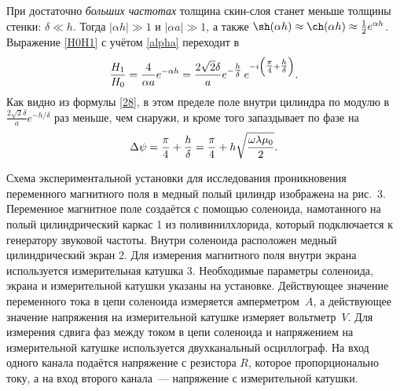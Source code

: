 При достаточно \emph{больших частотах} толщина скин-слоя станет меньше толщины стенки:
$\delta \ll h$. Тогда $|\alpha h| \gg 1$ и $|\alpha a| \gg 1$, а
также $\sh(\alpha h)\approx\ch(\alpha h)\approx\frac12e^{\alpha h}$.
Выражение \eqref{H0H1} с учётом \eqref{alpha} переходит в
\begin{equation} \eqmark{28}
\frac{H_1}{H_0}= \frac{4}{\alpha a} e^{-\alpha h}
= \frac{2\sqrt{2}\delta}{a}e^{-\tfrac{h}{\delta}}\,e^{-i\left(\tfrac{\pi}{4}+\tfrac{h}{\delta}\right)}.
\end{equation}
Как видно из формулы \eqref{28}, в этом пределе поле внутри цилиндра по модулю в
$\frac{2\sqrt{2}\delta}{a}e^{-h/\delta}$ раз меньше, чем снаружи, и
кроме того запаздывает по фазе на
\begin{equation} \eqmark{29}
\Delta\psi=\frac{\pi}{4}+\frac{h}{\delta}=
\frac{\pi}{4}+h\sqrt{\frac{\omega\lambda\mu_0}{2}}.
\end{equation}





\experiment
Схема экспериментальной установки для исследования проникновения переменного магнитного поля в медный полый цилиндр
изображена на рис.~3. Переменное магнитное поле создаётся с помощью соленоида, намотанного на полый цилиндрический каркас 1
из поливинилхлорида, который подключается к генератору звуковой частоты. Внутри соленоида расположен медный цилиндрический
экран 2. Для измерения магнитного поля внутри экрана используется измерительная катушка 3. Необходимые параметры
соленоида, экрана и измерительной катушки указаны на установке. Действующее значение переменного тока в цепи соленоида
измеряется амперметром~$A$, а действующее значение напряжения
на измерительной катушке измеряет вольтметр~$V$. Для измерения сдвига фаз между током в цепи соленоида и напряжением на измерительной катушке
используется двухканальный осциллограф. На вход одного канала подаётся напряжение с резистора $R$, которое
пропорционально току, а на вход второго канала~--- напряжение с измерительной катушки.

